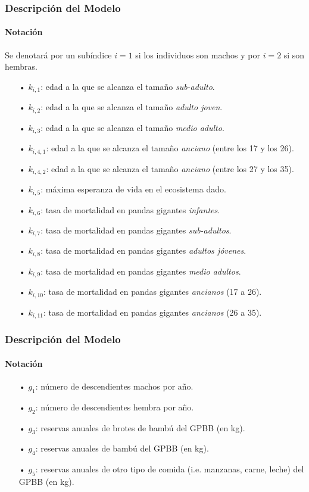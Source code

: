 \documentclass[10pt,a4paper]{beamer}
\theoremstyle{definition}
\theoremstyle{remark}
\begin{document}
\begin{frame}
\frametitle{Descripción del Modelo}
\framesubtitle{Notación}
\begin{small}
Se denotará por un subíndice $i=1$ si los individuos son machos y por $i=2$ si son hembras.\\

\begin{itemize}
\item[•] $k_{i,1}$: edad a la que se alcanza el tamaño \textit{sub-adulto}.
\item[•] $k_{i,2}$: edad a la que se alcanza el tamaño \textit{adulto joven}.
\item[•] $k_{i,3}$: edad a la que se alcanza el tamaño \textit{medio adulto}.
\item[•] $k_{i,4,1}$: edad a la que se alcanza el tamaño \textit{anciano} (entre los 17 y los 26).
\item[•] $k_{i,4,2}$: edad a la que se alcanza el tamaño \textit{anciano} (entre los 27 y los 35).
\item[•] $k_{i,5}$: máxima esperanza de vida en el ecosistema dado.
\item[•] $k_{i,6}$: tasa de mortalidad en pandas gigantes \textit{infantes}.
\item[•] $k_{i,7}$: tasa de mortalidad en pandas gigantes \textit{sub-adultos}.
\item[•] $k_{i,8}$: tasa de mortalidad en pandas gigantes \textit{adultos jóvenes}.
\item[•] $k_{i,9}$: tasa de mortalidad en pandas gigantes \textit{medio adultos}.
\item[•] $k_{i,10}$: tasa de mortalidad en pandas gigantes \textit{ancianos} (17 a 26).
\item[•] $k_{i,11}$: tasa de mortalidad en pandas gigantes \textit{ancianos} (26 a 35).
\end{itemize}
\end{small}
\end{frame}



\begin{frame}
\frametitle{Descripción del Modelo}
\framesubtitle{Notación}
\begin{small}
\begin{itemize}
\item[•] $g_{1}$: número de descendientes machos por año.
\item[•] $g_{2}$: número de descendientes hembra por año.
\item[•] $g_{3}$: reservas anuales de brotes de bambú del GPBB (en kg).
\item[•] $g_{4}$: reservas anuales de bambú del GPBB (en kg).
\item[•] $g_{5}$: reservas anuales de otro tipo de comida (i.e. manzanas, carne, leche) del GPBB (en kg).
\end{itemize}
\end{small}
\end{frame}
\end{document}
